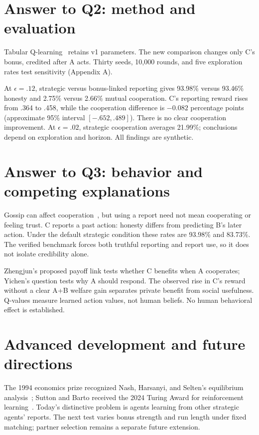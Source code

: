 \section{Answer to Q2: method and evaluation}
Tabular Q-learning~\cite{watkins1992} retains v1 parameters. The new comparison changes only C's bonus, credited after A acts. Thirty seeds, 10,000 rounds, and five exploration rates test sensitivity (Appendix A).

At $\epsilon=.12$, strategic versus bonus-linked reporting gives 93.98\% versus 93.46\% honesty and 2.75\% versus 2.66\% mutual cooperation. C's reporting reward rises from .364 to .458, while the cooperation difference is $-0.082$ percentage points (approximate 95\% interval $[-.652,.489]$). There is no clear cooperation improvement. At $\epsilon=.02$, strategic cooperation averages 21.99\%; conclusions depend on exploration and horizon. All findings are synthetic.

\clearpage\balance
\section{Answer to Q3: behavior and competing explanations}
Gossip can affect cooperation~\cite{sommerfeld2007}, but using a report need not mean cooperating or feeling trust. C reports a past action: honesty differs from predicting B's later action. Under the default strategic condition these rates are 93.98\% and 83.73\%. The verified benchmark forces both truthful reporting and report use, so it does not isolate credibility alone.

Zhengjun's proposed payoff link tests whether C benefits when A cooperates; Yichen's question tests why A should respond. The observed rise in C's reward without a clear A+B welfare gain separates private benefit from social usefulness. Q-values measure learned action values, not human beliefs. No human behavioral effect is established.

\section{Advanced development and future directions}
The 1994 economics prize recognized Nash, Harsanyi, and Selten's equilibrium analysis~\cite{nobel1994}; Sutton and Barto received the 2024 Turing Award for reinforcement learning~\cite{turing2024}. Today's distinctive problem is agents learning from other strategic agents' reports. The next test varies bonus strength and run length under fixed matching; partner selection remains a separate future extension.


